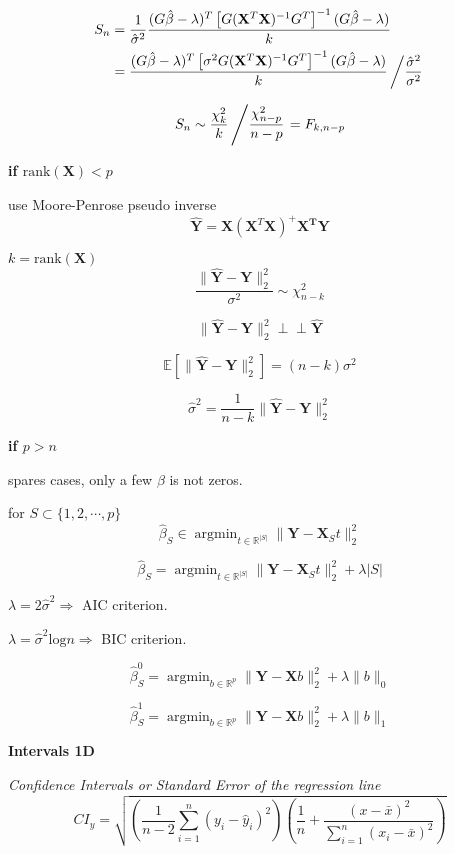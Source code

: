 \documentclass[12pt,a4paper]{article}
\DeclareMathOperator*{\argmin}{argmin}
\newcommand{\indep}{\perp \!\!\! \perp}
\begin{document}
\[
\arraycolsep=1.4pt
\def\arraystretch{2.5}
\begin{array}{rcl}
S_n  & = & \displaystyle  \frac{1}{\hat{\sigma}^2}\frac{(G\hat{\beta} - \lambda)^T\left[G(\mathbf{X}^T\mathbf{X})^{-1}G^T\right]^{-1}(G\hat{\beta} - \lambda)}{k} \\
 	 & = & \displaystyle \frac{(G\hat{\beta} - \lambda)^T\left[\sigma^2G(\mathbf{X}^T\mathbf{X})^{-1}G^T\right]^{-1}(G\hat{\beta} - \lambda)}{k} \left/ \frac{\hat{\sigma}^2}{\sigma^2} \right.\\
\end{array}
\]

\[
	S_n \sim \frac{\chi^2_k}{k}\left /\frac{\chi^2_{n-p}}{n-p} \right. = F_{k,n-p}
\]

\textbf{if $\mathrm{rank}(\mathbf{X}) < p$}

use Moore-Penrose pseudo inverse
\[
	\hat{\mathbf{Y}} = \mathbf{X}( \mathbf{X}^T\mathbf{X})^+\mathbf{X^T}\mathbf{Y}
\]

$k = \mathrm{rank}(\mathbf{X})$
\[
	\frac{\|\hat{\mathbf{Y}}-\mathbf{Y}\|^2_2}{\sigma^2} \sim \chi^2_{n-k}
\]

\[
\|\hat{\mathbf{Y}}-\mathbf{Y}\|^2_2 \indep \hat{\mathbf{Y}}
\]

\[
\mathbb{E}\left[\|\hat{\mathbf{Y}}-\mathbf{Y}\|^2_2 \right] = (n -k) \sigma^2
\] 

\[
\hat{\sigma}^2 = \frac{1}{n-k}\|\hat{\mathbf{Y}}-\mathbf{Y}\|^2_2
\] 

\textbf{if $p > n$}

spares cases, only a few $\beta$ is not zeros.

for $S \subset \{1,2,\cdots, p\}$
\[
\hat{\beta}_S \in \argmin_{t \in \mathbb{R}^{|S|}} \|\mathbf{Y}-\mathbf{X}_St\|^2_2
\]

\[
\hat{\beta}_S = \argmin_{t \in \mathbb{R}^{|S|}} \|\mathbf{Y}-\mathbf{X}_St\|^2_2 + \lambda|S|
\]

$\lambda = 2\hat{\sigma}^2 \Rightarrow$ AIC criterion.

$\lambda = \hat{\sigma}^2\mathrm{log}n \Rightarrow$ BIC criterion.


\[
\hat{\beta}_S^0 = \argmin_{b \in \mathbb{R}^p} \|\mathbf{Y}-\mathbf{X}b\|^2_2 + \lambda\|b\|_0
\]

\[
\hat{\beta}_S^1 = \argmin_{b \in \mathbb{R}^p} \|\mathbf{Y}-\mathbf{X}b\|^2_2 + \lambda\|b\|_1
\]


\textbf{Intervals 1D}

\textit{Confidence Intervals or Standard Error of the regression line}
\[
CI_y = \sqrt{
\left(\frac{1}{n-2}\sum_{i=1}^{n}(y_i-\hat{y}_i)^2 \right)
\left(\frac{1}{n}+\frac{(x-\bar{x})^2}{\sum_{i=1}^{n}(x_i-\bar{x})^2}
\right)
}
\]
\end{document}
